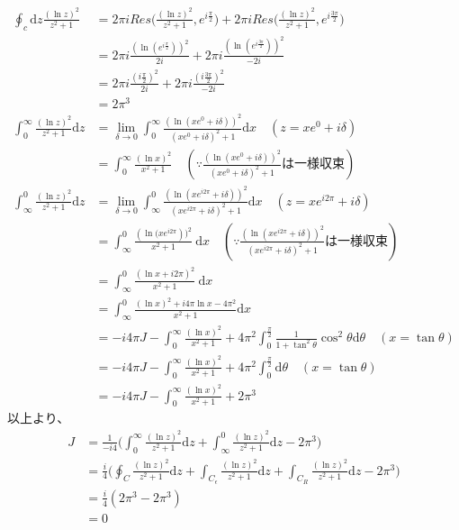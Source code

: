 \documentclass[dvipdfmx,a4paper]{jsarticle}
\begin{document}
 \begin{align*}
 \oint_c\mathrm{d}z\frac{(\ln{z})^2}{z^2 + 1} &= 2\pi iRes\biggl(\frac{(\ln{z})^2}{z^2 + 1}, e^{i\frac{\pi}{2}}\biggr) + 2\pi iRes\biggl(\frac{(\ln{z})^2}{z^2 + 1}, e^{i\frac{3\pi}{2}}\biggr)\\
 &= 2\pi i \frac{(\ln{(e^{i\frac{\pi}{2}})})^2}{2i} + 2\pi i \frac{(\ln{(e^{i\frac{3\pi}{2}})})^2}{ -2i}\\
 &= 2\pi i \frac{(i\frac{\pi}{2})^2}{2i} + 2\pi i \frac{(i\frac{3\pi}{2})^2}{ -2i}\\
 &= 2\pi^3\\
  \int_{0}^{\infty} \frac{(\ln{z})^2}{z^2 + 1} \mathrm{d}z &= \lim_{\delta \to 0}\int_{0}^{\infty} \frac{(\ln{(xe^0 + i\delta)})^2}{(xe^0 + i\delta)^2 + 1} \mathrm{d}x \quad(z = xe^0 + i\delta)\\
 &= \int_{0}^{\infty}  \frac{(\ln{x})^2}{x^2 + 1}\quad(\because \frac{(\ln{(xe^0 + i\delta)})^2}{(xe^0 + i\delta)^2 + 1} は一様収束)\\
 \int_{\infty}^{0} \frac{(\ln{z})^2}{z^2 + 1} \mathrm{d}z &= \lim_{\delta \to 0}\int_{\infty}^{0} \frac{(\ln{(xe^{i2\pi} + i\delta)})^2}{(xe^{i2\pi} + i\delta)^2 + 1}\mathrm{d}x \quad(z = xe^{i2\pi} + i\delta)\\
 &= \int_{\infty}^{0} \frac{(\ln{(xe^{i2\pi}}))^2}{x^2 + 1}\ \mathrm{d}x\quad(\because\frac{(\ln{(xe^{i2\pi} + i\delta)})^2}{(xe^{i2\pi} + i\delta)^2 + 1}は一様収束)\\
 &= \int_{\infty}^{0} \frac{(\ln{x} + i2\pi)^2}{x^2 + 1}\ \mathrm{d}x\\
 &= \int_{\infty}^{0} \frac{(\ln{x})^2  + i4\pi\ln{x} -4\pi^2}{x^2 + 1}\mathrm{d}x\\
 &= -i4\pi J - \int_{0}^{\infty} \frac{(\ln{x})^2}{x^2 + 1} + 4 \pi^2 \int_0^{\frac{\pi}{2}}\frac{1}{1 + \tan^2{\theta}}\cos^2{\theta}\mathrm{d}\theta\quad(x = \tan{\theta})\\
 &= -i4\pi J - \int_{0}^{\infty} \frac{(\ln{x})^2}{x^2 + 1} + 4 \pi^2 \int_0^{\frac{\pi}{2}}\mathrm{d}\theta\quad(x = \tan{\theta})\\
 &=  -i4\pi J - \int_{0}^{\infty} \frac{(\ln{x})^2}{x^2 + 1} + 2\pi^3
 \end{align*}
 以上より、
 \begin{align*}
 J &= \frac{1}{-i4}\biggl(\int_{0}^{\infty} \frac{(\ln{z})^2}{z^2 + 1} \mathrm{d}z + \int_{\infty}^{0} \frac{(\ln{z})^2}{z^2 + 1} \mathrm{d}z - 2\pi^3\biggr)\\
 &=\frac{i}{4}\biggl(\oint_C\frac{(\ln{z})^2}{z^2 + 1}\mathrm{d}z + \int_{C_\epsilon}\frac{(\ln{z})^2}{z^2 + 1}\mathrm{d}z +  \int_{C_R}\frac{(\ln{z})^2}{z^2 + 1}\mathrm{d}z - 2\pi^3\biggr)\\
&=\frac{i}{4}( 2\pi^3 - 2\pi^3)\\
&= 0
 \end{align*}
\\
\end{document}
